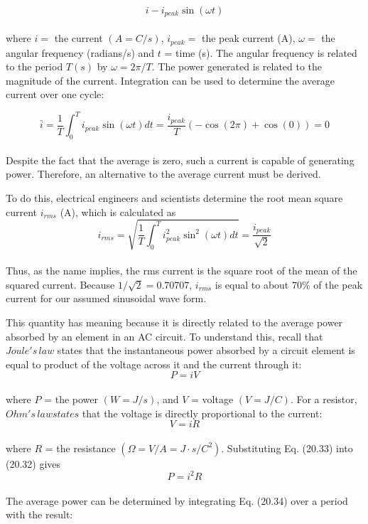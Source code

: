 \documentclass[../main.tex]{subfiles}
\begin{document}
	$$i-i_{peak} \sin(\omega t)$$\\
where $i =$ the current $(A = C/s)$, $i_{peak} =$ the peak current (A), $\omega =$ the angular frequency
(radians/s) and $t$ = time (s). The angular frequency is related to the period $T(s)$ by $\omega = 2\pi/T$.
The power generated is related to the magnitude of the current. Integration can be used
to determine the average current over one cycle:

	$$\bar{i} = \dfrac{1}{T} \int^{T}_{0} i_{peak} \sin (\omega t)dt = \dfrac{i_{peak}}{T} (- \cos(2\pi) + \cos(0)) = 0$$\\
Despite the fact that the average is zero, such a current is capable of generating power.
Therefore, an alternative to the average current must be derived.

To do this, electrical engineers and scientists determine the root mean square current
$i_{rms}$ (A), which is calculated as
\begin{equation}
	\tag{20.31}
	i_{rms} = \sqrt{\dfrac{1}{T} \int^{T}_{0} i^{2}_{peak} \sin^2 (\omega t) dt } = \dfrac{i_{peak}}{\sqrt{2}}
\end{equation}\\
Thus, as the name implies, the rms current is the square root of the mean of the squared current. Because $1/\sqrt{2} = 0.70707$, $i_{rms}$ is equal to about $70\%$ of the peak current for our assumed sinusoidal wave form.

This quantity has meaning because it is directly related to the average power absorbed
by an element in an AC circuit. To understand this, recall that $Joule's \, law$ states that the instantaneous power absorbed by a circuit element is equal to product of the voltage across it
and the current through it:
\begin{equation}
	\tag{20.32}
	P=iV
\end{equation}\\
where $P$ = the power $(W = J/s)$, and $V$ = voltage $(V = J/C)$. For a resistor, $Ohm's \, law states$
that the voltage is directly proportional to the current:
\begin{equation}
	\tag{20.33}
	V=iR
\end{equation}\\
where $R$ = the resistance $(\Omega = V/A = J · s/C^{2})$. Substituting Eq. (20.33) into (20.32) gives
\begin{equation}
	\tag{20.34}
	P=i^{2}R
\end{equation}\\
The average power can be determined by integrating Eq. (20.34) over a period with the result:
\end{document}
